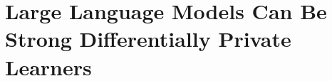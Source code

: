 \chapter[Language Models Can Be Strong Differentially Private Learners]{\LARGE Large Language Models Can Be Strong Differentially Private Learners}\label{ch_3}
